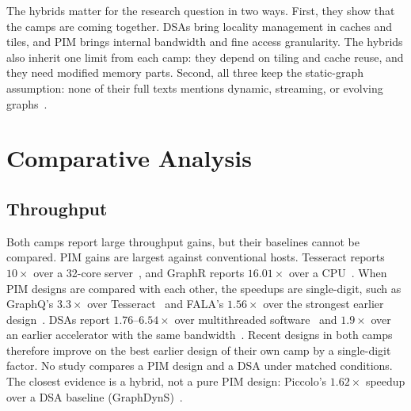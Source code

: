 \documentclass[journal,onecolumn]{IEEEtran}
\begin{document}
The hybrids matter for the research question in two ways. First, they show that the camps are coming together. DSAs bring locality management in caches and tiles, and PIM brings internal bandwidth and fine access granularity. The hybrids also inherit one limit from each camp: they depend on tiling and cache reuse, and they need modified memory parts. Second, all three keep the static-graph assumption: none of their full texts mentions dynamic, streaming, or evolving graphs~\cite{shin2025piccolo,shin2025fala,yenimol2026cograf}.

\section{Comparative Analysis}\label{sec:analysis}
\subsection{Throughput}
Both camps report large throughput gains, but their baselines cannot be compared. PIM gains are largest against conventional hosts. Tesseract reports $10\times$ over a 32-core server~\cite{ahn2015tesseract}, and GraphR reports $16.01\times$ over a CPU~\cite{song2018graphr}. When PIM designs are compared with each other, the speedups are single-digit, such as GraphQ's $3.3\times$ over Tesseract~\cite{zhuo2019graphq} and FALA's $1.56\times$ over the strongest earlier design~\cite{shin2025fala}. DSAs report $1.76$--$6.54\times$ over multithreaded software~\cite{ham2016graphicionado} and $1.9\times$ over an earlier accelerator with the same bandwidth~\cite{yan2019graphdyns}. Recent designs in both camps therefore improve on the best earlier design of their own camp by a single-digit factor. No study compares a PIM design and a DSA under matched conditions. The closest evidence is a hybrid, not a pure PIM design: Piccolo's $1.62\times$ speedup over a DSA baseline (GraphDynS)~\cite{shin2025piccolo}.
\end{document}
